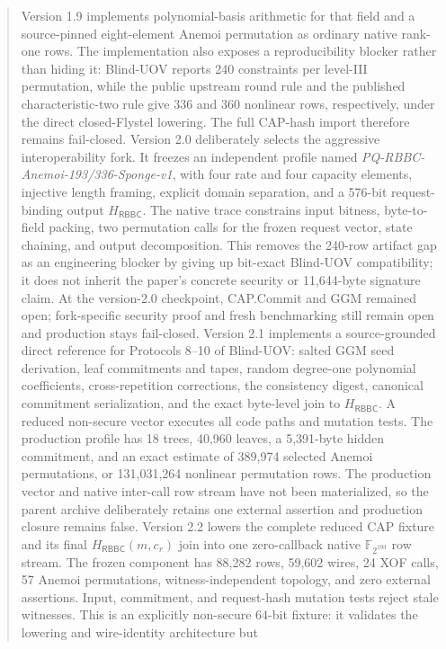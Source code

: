 \documentclass[11pt]{article}
\newcommand{\RBBC}{\mathsf{RBBC}}
\begin{document}
\begin{abstract}
Version 1.9 implements polynomial-basis arithmetic for that field and a
source-pinned eight-element Anemoi permutation as ordinary native rank-one
rows.  The implementation also exposes a reproducibility blocker rather than
hiding it: Blind-UOV reports 240 constraints per level-III permutation, while
the public upstream round rule and the published characteristic-two rule give
336 and 360 nonlinear rows, respectively, under the direct closed-Flystel
lowering.  The full CAP-hash import therefore remains fail-closed.
Version 2.0 deliberately selects the aggressive interoperability fork.  It
freezes an independent profile named
\emph{PQ-RBBC-Anemoi-193/336-Sponge-v1}, with four rate and four capacity
elements, injective length framing, explicit domain separation, and a 576-bit
request-binding output $H_{\RBBC}$.  The native trace constrains input bitness,
byte-to-field packing, two permutation calls for the frozen request vector,
state chaining, and output decomposition.  This removes the 240-row artifact
gap as an engineering blocker by giving up bit-exact Blind-UOV compatibility;
it does not inherit the paper's concrete security or 11,644-byte signature
claim.  At the version-2.0 checkpoint, CAP.Commit and GGM remained open;
fork-specific security proof and fresh benchmarking still remain open and
production stays fail-closed.
Version 2.1 implements a source-grounded direct reference for Protocols
8--10 of Blind-UOV: salted GGM seed derivation, leaf commitments and tapes,
random degree-one polynomial coefficients, cross-repetition corrections,
the consistency digest, canonical commitment serialization, and the exact
byte-level join to $H_{\RBBC}$.  A reduced non-secure vector executes all code
paths and mutation tests.  The production profile has 18 trees, 40,960 leaves,
a 5,391-byte hidden commitment, and an exact estimate of 389,974 selected
Anemoi permutations, or 131,031,264 nonlinear permutation rows.  The production
vector and native inter-call row stream have not been materialized, so the
parent archive deliberately retains one external assertion and production
closure remains false.
Version 2.2 lowers the complete reduced CAP fixture and its final
$H_{\RBBC}(m,c_r)$ join into one zero-callback native
$\mathbb F_{2^{193}}$ row stream.  The frozen component has 88,282 rows,
59,602 wires, 24 XOF calls, 57 Anemoi permutations, witness-independent
topology, and zero external assertions.  Input, commitment, and request-hash
mutation tests reject stale witnesses.  This is an explicitly non-secure
64-bit fixture: it validates the lowering and wire-identity architecture but

\end{abstract}
\end{document}
